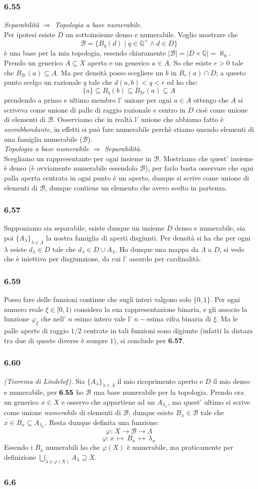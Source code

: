 \documentclass[a4paper,11pt]{article}
\newcommand{\ex}[1]{\subsubsection*{#1}}
\newcommand{\QQ}{\mathbb{Q}}
\newcommand{\cart}{\times}
\newcommand{\rec}[1]{{\bf #1}}
\newcommand{\norm}[1]{\mid{#1}\mid}
\begin{document}
\ex{6.55}{\it Separabilità $\Rightarrow$ Topologia a base numerabile.}\\
Per ipotesi esiste $D$ un sottoinsieme denso e numerabile. Voglio mostrare che
$$\mathcal{B}=\{B_q(d)\mid q\in\QQ^+ \wedge d\in D\}$$
è una base per la mia topologia, essendo chiaramente $\norm{\mathcal{B}}=\norm{D\cart \QQ}=\aleph_0$. Prendo un generico $A\subseteq X$ aperto e un generico $a\in A$. So che esiste $r>0$ tale che $B_{2r}(a)\subseteq A$. Ma per densità posso scegliere un $b$ in $B_r(a)\cap D$; a questo punto scelgo un razionale $q$ tale che $d(a,b)<q<r$ ed ho che:
$$
\{a\}\subseteq B_q(b)\subseteq B_{2r}(a)\subseteq A
$$
prendendo a primo e ultimo membro l' unione per ogni $a\in A$ ottengo che $A$ si scriveva come unione di palle di raggio razionale e centro in $D$ cioè come unione di elementi di $\mathcal{B}$. Osserviamo che in realtà l' unione che abbiamo fatto è {\it sovrabbondante}, in effetti si può fare numerabile perchè stiamo unendo elementi di una famiglia numerabile ($\mathcal{B}$).\\
{\it Topologia a base numerabile $\Rightarrow$ Separabilità.}\\
Scegliamo un rappresentante per ogni insieme in $\mathcal{B}$. Mostriamo che quest' insieme è denso (è ovviamente numerabile essendolo $\mathcal{B}$), per farlo basta osservare che ogni palla aperta centrata in ogni punto è un aperto, dunque si scrive come unione di elementi di $\mathcal{B}$, dunque contiene un elemento che avevo scelto in partenza.\\
\ex{6.57} Supponiamo sia separabile, esiste dunque un insieme $D$ denso e numerabile, sia poi $\{A_{\lambda}\}_{\lambda\in\Lambda}$ la nostra famiglia di aperti disgiunti. Per densità si ha che per ogni $\lambda$ esiste $d_{\lambda}\in D$ tale che $d_{\lambda}\in D \cup A_{\lambda}$. Ho dunque una mappa da $\Lambda$ a $D$, si vede che è iniettiva per disgiunzione, da cui l' assurdo per cardinalità.
\ex{6.59} Posso fare delle funzioni continue che sugli interi valgono solo $\{0, 1\}$. Per ogni numero reale $\xi \in[0,1)$ considero la sua rappresentazione binaria, e gli associo la funzione $\varphi _{\xi}$ che nell' $n$ esimo intero vale l' $n-$esima cifra binaria di $\xi$. Ma le palle aperte di raggio $1/2$ centrate in tali funzioni sono digiunte (infatti la distaza tra due di queste diverse è sempre $1$), si conclude per \rec{6.57}.
\ex{6.60} {\it (Teorema di Lindelof).} Sia $\{A_{\lambda}\}_{\lambda\in\Lambda}$ il mio ricoprimento aperto e $D$ il mio denso e numerabile, per $\rec{6.55}$ ho $\mathcal{B}$ una base numerabile per la topologia. Prendo ora un generico $x\in X$ e osservo che appartiene ad un $A_{\lambda_x}$, ma quest' ultimo si scrive come unione {\it numerabile} di elementi di ${\mathcal{B}}$; dunque esiste $B_x \in \mathcal{B}$ tale che $x\in B_x\subseteq A_{\lambda_x}$. Resta dunque definita una funzione:
$$
\varphi:\,  X \rightarrow \mathcal{B} \rightarrow \Lambda
$$
$$
\varphi: x\, \mapsto\, B_x\, \mapsto \, \lambda_x
$$
Essendo i $B_x$ numerabili ho che $\varphi(X)$ è numerabile, ma praticamente per definizione $\displaystyle \bigcup_{\lambda \in \varphi (X)}A_{\lambda}\supseteq X$.\\
\ex{6.6}
\end{document}
